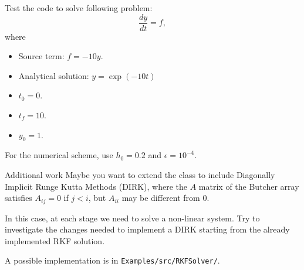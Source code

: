\documentclass[10pt,aspectratio=169]{beamer}
\begin{document}
\begin{frame}{}
	Test the code to solve following problem:
	\begin{equation}
\frac{dy}{dt} = f,
	\end{equation}
	where
	\begin{itemize}
		\item Source term: $f = -10y$.
		\item Analytical solution: $y =
	 \exp(-10t)$
		\item $t_0 = 0$.
		\item $t_f = 10$.
		\item $y_0 = 1$.
	\end{itemize}
			
	For the numerical scheme, use $h_0 = 0.2$ and $\epsilon = 10^{-4}$.
\end{frame}


\begin{frame}{Additional work}
  Maybe you want to extend the class to include Diagonally Implicit Runge Kutta Methods
  (DIRK), where the $A$ matrix of the Butcher array satisfies $A_{ij}=0$ if $j<i$, but
  $A_{ii}$ may be different from $0$.
  \smallskip
  
  In this case, at each stage we need to solve a non-linear system. Try to investigate the changes needed to implement a DIRK starting from the already implemented RKF solution.
  \smallskip
  
  A possible implementation is in \texttt{Examples/src/RKFSolver/}.
\end{frame}
\end{document}
